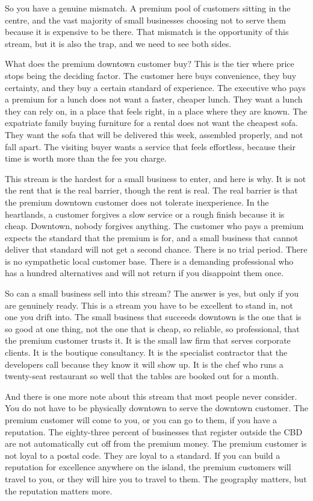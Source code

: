 \documentclass[10pt,twoside,openany]{memoir}
\begin{document}
{{{{{{{{{{{{{{So you have a genuine mismatch. A premium pool of customers sitting in
the centre, and the vast majority of small businesses choosing not to
serve them because it is expensive to be there. That mismatch is the
opportunity of this stream, but it is also the trap, and we need to see
both sides.

What does the premium downtown customer buy? This is the tier where
price stops being the deciding factor. The customer here buys
convenience, they buy certainty, and they buy a certain standard of
experience. The executive who pays a premium for a lunch does not want a
faster, cheaper lunch. They want a lunch they can rely on, in a place
that feels right, in a place where they are known. The expatriate family
buying furniture for a rental does not want the cheapest sofa. They want
the sofa that will be delivered this week, assembled properly, and not
fall apart. The visiting buyer wants a service that feels effortless,
because their time is worth more than the fee you charge.

This stream is the hardest for a small business to enter, and here is
why. It is not the rent that is the real barrier, though the rent is
real. The real barrier is that the premium downtown customer does not
tolerate inexperience. In the heartlands, a customer forgives a slow
service or a rough finish because it is cheap. Downtown, nobody forgives
anything. The customer who pays a premium expects the standard that the
premium is for, and a small business that cannot deliver that standard
will not get a second chance. There is no trial period. There is no
sympathetic local customer base. There is a demanding professional who
has a hundred alternatives and will not return if you disappoint them
once.

So can a small business sell into this stream? The answer is yes, but
only if you are genuinely ready. This is a stream you have to be
excellent to stand in, not one you drift into. The small business that
succeeds downtown is the one that is so good at one thing, not the one
that is cheap, so reliable, so professional, that the premium customer
trusts it. It is the small law firm that serves corporate clients. It is
the boutique consultancy. It is the specialist contractor that the
developers call because they know it will show up. It is the chef who
runs a twenty-seat restaurant so well that the tables are booked out for
a month.

And there is one more note about this stream that most people never
consider. You do not have to be physically downtown to serve the
downtown customer. The premium customer will come to you, or you can go
to them, if you have a reputation. The eighty-three percent of
businesses that register outside the CBD are not automatically cut off
from the premium money. The premium customer is not loyal to a postal
code. They are loyal to a standard. If you can build a reputation for
excellence anywhere on the island, the premium customers will travel to
you, or they will hire you to travel to them. The geography matters, but
the reputation matters more.

}}}}}}}}}}}}}}
\end{document}
